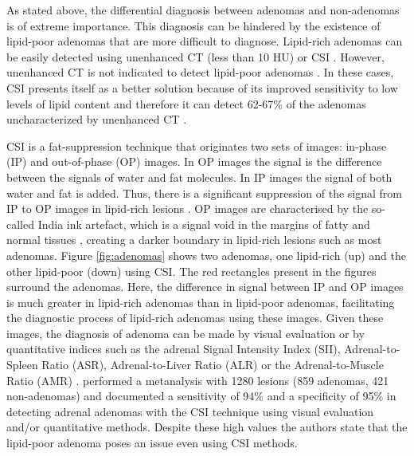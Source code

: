 \documentclass{article}
\begin{document}
As stated above, the differential diagnosis between adenomas and non-adenomas is
of extreme importance. This diagnosis can be hindered by the existence of
lipid-poor adenomas that are more difficult to diagnose. Lipid-rich adenomas can
be easily detected using unenhanced CT (less than 10 HU) \cite{Panda2015} or CSI
\cite{Platzek2019}. However, unenhanced CT is not indicated to detect lipid-poor
adenomas \cite{Israel2004}. In these cases, CSI presents itself as a better
solution because of its improved sensitivity to low levels of lipid content and
therefore it can detect 62-67\% of the adenomas uncharacterized by unenhanced CT
\cite{Israel2004}.

CSI is a fat-suppression technique that originates two sets of images: in-phase
(IP) and out-of-phase (OP) images. In OP images the signal is the difference
between the signals of water and fat molecules. In IP images the signal of both
water and fat is added. Thus, there is a significant suppression of the signal
from IP to OP images in lipid-rich lesions \cite{Jahanvi2021}. OP images are
characterised by the so-called India ink artefact, which is a signal void in the
margins of fatty and normal tissues \cite{Jahanvi2021}, creating a darker
boundary in lipid-rich lesions such as most adenomas. Figure \ref{fig:adenomas}
shows two adenomas, one lipid-rich (up) and the other lipid-poor (down) using
CSI. The red rectangles present in the figures surround the adenomas. Here, the
difference in signal between IP and OP images is much greater in lipid-rich
adenomas than in lipid-poor adenomas, facilitating the diagnostic process of
lipid-rich adenomas using these images. Given these images, the diagnosis of
adenoma can be made by visual evaluation or by quantitative indices such as the
adrenal Signal Intensity Index (SII), Adrenal-to-Spleen Ratio (ASR),
Adrenal-to-Liver Ratio (ALR) or the Adrenal-to-Muscle Ratio (AMR)
\cite{Fujiyoshi2003}. \cite{Platzek2019} performed a metanalysis with 1280
lesions (859 adenomas, 421 non-adenomas) and documented a sensitivity of 94\% and
a specificity of 95\% in detecting adrenal adenomas with the CSI technique using
visual evaluation and/or quantitative methods. Despite these high values the
authors state that the lipid-poor adenoma poses an issue even using CSI methods.
\end{document}
